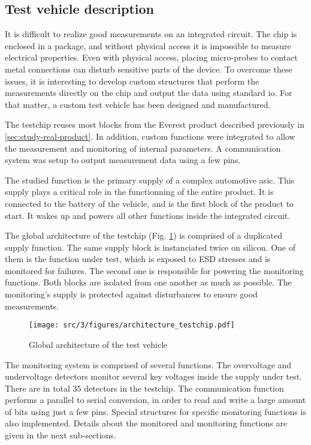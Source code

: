\subsection{Test vehicle description}

It is difficult to realize good measurements on an integrated circuit.
The chip is enclosed in a package, and without physical access it is impossible to measure electrical properties.
Even with physical access, placing micro-probes to contact metal connections can disturb sensitive parts of the device.
To overcome these issues, it is interesting to develop custom structures that perform the measurements directly on the chip and output the data using standard \gls{io}.
For that matter, a custom test vehicle has been designed and manufactured.

The testchip reuses most blocks from the Everest product described previously in \ref{sec:study-real-product}.
In addition, custom functions were integrated to allow the measurement and monitoring of internal parameters.
A communication system was setup to output measurement data using a few pins.

The studied function is the primary supply of a complex automotive \gls{asic}.
This supply plays a critical role in the functionning of the entire product.
It is connected to the battery of the vehicle, and is the first block of the product to start.
It wakes up and powers all other functions inside the integrated circuit.

The global architecture of the testchip (Fig. \ref{architecture_testchip}) is comprised of a duplicated supply function.
The same supply block is instanciated twice on silicon.
One of them is the function under test, which is exposed to \gls{ESD} stresses and is monitored for failures.
The second one is responsible for powering the monitoring functions.
Both blocks are isolated from one another as much as possible.
The monitoring's supply is protected against disturbances to ensure good measurements.

\begin{figure}[h]
  \centering
  \texttt{[image: src/3/figures/architecture\_testchip.pdf]}
  \caption{Global architecture of the test vehicle}
  \label{architecture_testchip}
\end{figure}

The monitoring system is comprised of several functions.
The overvoltage and undervoltage detectors monitor several key voltages inside the supply under test.
There are in total 35 detectors in the testchip.
The communication function performs a parallel to serial conversion, in order to read and write a large amount of bits using just a few pins.
Special structures for specific monitoring functions is also implemented.
Details about the monitored and monitoring functions are given in the next sub-sections.

